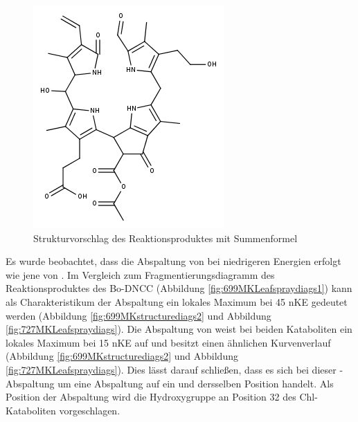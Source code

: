 \begin{figure}[!htbp]
  \centering
  \includegraphics[scale=0.6]{figures/Kapitel4/Kataboliten/fragmentation_structures/VWA_Katabolit_727.png}
  \caption[Strukturvorschlag des Reaktionsproduktes von Bo-NCC-3, Quelle: Autor]{Strukturvorschlag des Reaktionsproduktes mit Summenformel }
  \label{fig:727MKstructure}
\end{figure}

Es wurde beobachtet, dass die Abspaltung von  bei niedrigeren Energien erfolgt wie jene von . Im Vergleich zum Fragmentierungsdiagramm des Reaktionsproduktes des Bo-DNCC (Abbildung \ref{fig:699MKLeafspraydiags1}) kann als Charakteristikum der  Abspaltung ein lokales Maximum bei 45 \gls{nKE} gedeutet werden (Abbildung \ref{fig:699MKstructurediags2} und Abbildung \ref{fig:727MKLeafspraydiags}). Die Abspaltung von  weist bei beiden Kataboliten ein lokales Maximum bei 15 \gls{nKE} auf und besitzt einen ähnlichen Kurvenverlauf (Abbildung \ref{fig:699MKstructurediags2} und Abbildung \ref{fig:727MKLeafspraydiags}). Dies lässt darauf schließen, dass es sich bei dieser -Abspaltung um eine Abspaltung auf ein und dersselben Position handelt. Als Position der Abspaltung wird die Hydroxygruppe an Position 32 des Chl-Kataboliten vorgeschlagen. 

